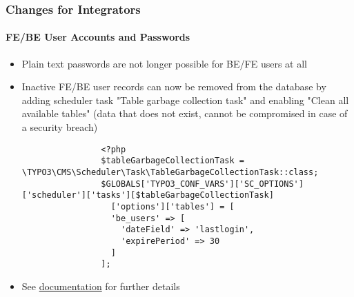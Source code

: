 \begin{frame}[fragile]
	\frametitle{Changes for Integrators}
	\framesubtitle{FE/BE User Accounts and Passwords}

	\lstset{basicstyle=\tiny\ttfamily}

	\begin{itemize}
		\item Plain text passwords are not longer possible for BE/FE users at all
		\item Inactive FE/BE user records can now be removed from the database by
			adding scheduler task "Table garbage collection task" and enabling
			"Clean all available tables"\newline
			\smaller
				(data that does not exist, cannot be compromised in case of a
				security breach)
			\normalsize

			\begin{lstlisting}
				<?php
				$tableGarbageCollectionTask = \TYPO3\CMS\Scheduler\Task\TableGarbageCollectionTask::class;
				$GLOBALS['TYPO3_CONF_VARS']['SC_OPTIONS']['scheduler']['tasks'][$tableGarbageCollectionTask]
				  ['options']['tables'] = [
				  'be_users' => [
				    'dateField' => 'lastlogin',
				    'expirePeriod' => 30
				  ]
				];
			\end{lstlisting}

		\item See \href{https://docs.typo3.org/typo3cms/extensions/scheduler/Installation/BaseTasks/Index.html}{documentation}
			for further details
	\end{itemize}

\end{frame}


